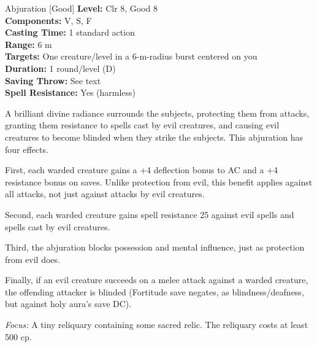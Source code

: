 {Abjuration [Good]}
{
	\textbf{Level:}
	Clr 8, Good 8\\
	\textbf{Components:}
	V, S, F\\
	\textbf{Casting Time:}
	1 standard action\\
	\textbf{Range:}
	6 m\\
	\textbf{Targets:}
	One creature/level in a 6-m-radius burst centered on you\\
	\textbf{Duration:}
	1 round/level (D)\\
	\textbf{Saving Throw:}
	See text\\
	\textbf{Spell Resistance:}
	Yes (harmless)\\
}
{
	A brilliant divine radiance surrounds the subjects, protecting them from attacks, granting them resistance to spells cast by evil creatures, and causing evil creatures to become blinded when they strike the subjects. This abjuration has four effects.

	First, each warded creature gains a +4 deflection bonus to AC and a +4 resistance bonus on saves. Unlike protection from evil, this benefit applies against all attacks, not just against attacks by evil creatures.

	Second, each warded creature gains spell resistance 25 against evil spells and spells cast by evil creatures.

	Third, the abjuration blocks possession and mental influence, just as protection from evil does.

	Finally, if an evil creature succeeds on a melee attack against a warded creature, the offending attacker is blinded (Fortitude save negates, as blindness/deafness, but against holy aura's save DC).

	\textit{Focus:}
	A tiny reliquary containing some sacred relic. The reliquary costs at least 500 cp.

}
